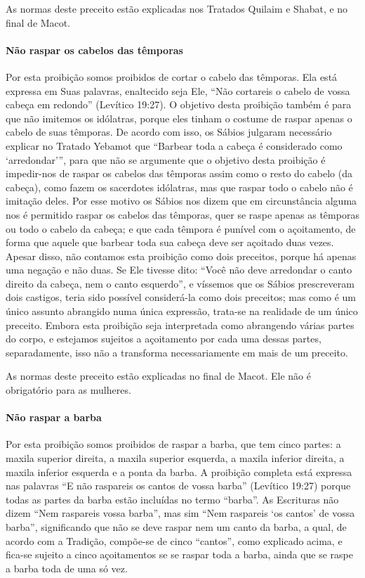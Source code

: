 As normas deste preceito estão explicadas nos Tratados Quilaim e Shabat,
e no final de Macot.

\paragraph{Não raspar os cabelos das têmporas}

Por esta proibição somos proibidos de cortar o cabelo das têmporas. Ela
está expressa em Suas palavras, enaltecido seja Ele, ``Não cortareis o
cabelo de vossa cabeça em redondo'' (Levítico 19:27). O objetivo desta
proibição também é para que não imitemos os idólatras, porque eles
tinham o costume de raspar apenas o cabelo de suas têmporas. De acordo
com isso, os Sábios julgaram necessário explicar no Tratado Yebamot que
``Barbear toda a cabeça é considerado como `arredondar''', para que não
se argumente que o objetivo desta proibição é impedir-nos de raspar os
cabelos das têmporas assim como o resto do cabelo (da cabeça), como
fazem os sacerdotes idólatras, mas que raspar todo o cabelo não é
imitação deles. Por esse motivo os Sábios nos dizem que em circunstância
alguma nos é permitido raspar os cabelos das têmporas, quer se raspe
apenas as têmporas ou todo o cabelo da cabeça; e que cada têmpora é
punível com o açoitamento, de forma que aquele que barbear toda sua
cabeça deve ser açoitado duas vezes. Apesar disso, não contamos esta
proibição como dois preceitos, porque há apenas uma negação e não duas.
Se Ele tivesse dito: ``Você não deve arredondar o canto direito da
cabeça, nem o canto esquerdo'', e víssemos que os Sábios prescreveram
dois castigos, teria sido possível considerá-la como dois preceitos; mas
como é um único assunto abrangido numa única expressão, trata-se na
realidade de um único preceito. Embora esta proibição seja interpretada
como abrangendo várias partes do corpo, e estejamos sujeitos a
açoitamento por cada uma dessas partes, separadamente, isso não a
transforma necessariamente em mais de um preceito.

As normas deste preceito estão explicadas no final de Macot. Ele não é
obrigatório para as mulheres.

\paragraph{Não raspar a barba}

Por esta proibição somos proibidos de raspar a barba, que tem cinco
partes: a maxila superior direita, a maxila superior esquerda, a maxila
inferior direita, a maxila inferior esquerda e a ponta da barba. A
proibição completa está expressa nas palavras ``E não raspareis os
cantos de vossa barba'' (Levítico 19:27) porque todas as partes da
barba estão incluídas no termo ``barba''. As Escrituras não dizem ``Nem
raspareis vossa barba'', mas sim ``Nem raspareis `os cantos' de vossa
barba'', significando que não se deve raspar nem um canto da barba, a
qual, de acordo com a Tradição, compõe-se de cinco ``cantos'', como
explicado acima, e fica-se sujeito a cinco açoitamentos se se raspar
toda a barba, ainda que se raspe a barba toda de uma só vez.

